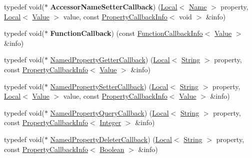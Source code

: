 \begin{DoxyCompactItemize}
\item 
\mbox{\label{namespacev8_a476b359c9fc5ad874bcc2a1a21075556}} 
typedef void($\ast$ {\bfseries Accessor\+Name\+Setter\+Callback}) (\mbox{\hyperlink{classv8_1_1Local}{Local}}$<$ \mbox{\hyperlink{classv8_1_1Name}{Name}} $>$ property, \mbox{\hyperlink{classv8_1_1Local}{Local}}$<$ \mbox{\hyperlink{classv8_1_1Value}{Value}} $>$ value, const \mbox{\hyperlink{classv8_1_1PropertyCallbackInfo}{Property\+Callback\+Info}}$<$ void $>$ \&info)
\item 
\mbox{\label{namespacev8_a9eb0624666bb117aea1fb9c9424dcc1b}} 
typedef void($\ast$ {\bfseries Function\+Callback}) (const \mbox{\hyperlink{classv8_1_1FunctionCallbackInfo}{Function\+Callback\+Info}}$<$ \mbox{\hyperlink{classv8_1_1Value}{Value}} $>$ \&info)
\item 
typedef void($\ast$ \mbox{\hyperlink{namespacev8_a50cae386a68bf9ff23d02aa1161face4}{Named\+Property\+Getter\+Callback}}) (\mbox{\hyperlink{classv8_1_1Local}{Local}}$<$ \mbox{\hyperlink{classv8_1_1String}{String}} $>$ property, const \mbox{\hyperlink{classv8_1_1PropertyCallbackInfo}{Property\+Callback\+Info}}$<$ \mbox{\hyperlink{classv8_1_1Value}{Value}} $>$ \&info)
\item 
typedef void($\ast$ \mbox{\hyperlink{namespacev8_a9587769513971dc7cb301b740d9e66b6}{Named\+Property\+Setter\+Callback}}) (\mbox{\hyperlink{classv8_1_1Local}{Local}}$<$ \mbox{\hyperlink{classv8_1_1String}{String}} $>$ property, \mbox{\hyperlink{classv8_1_1Local}{Local}}$<$ \mbox{\hyperlink{classv8_1_1Value}{Value}} $>$ value, const \mbox{\hyperlink{classv8_1_1PropertyCallbackInfo}{Property\+Callback\+Info}}$<$ \mbox{\hyperlink{classv8_1_1Value}{Value}} $>$ \&info)
\item 
typedef void($\ast$ \mbox{\hyperlink{namespacev8_ac135beae5f0c8b290255accb438f990e}{Named\+Property\+Query\+Callback}}) (\mbox{\hyperlink{classv8_1_1Local}{Local}}$<$ \mbox{\hyperlink{classv8_1_1String}{String}} $>$ property, const \mbox{\hyperlink{classv8_1_1PropertyCallbackInfo}{Property\+Callback\+Info}}$<$ \mbox{\hyperlink{classv8_1_1Integer}{Integer}} $>$ \&info)
\item 
typedef void($\ast$ \mbox{\hyperlink{namespacev8_aaba861076c5b111912cfa0791d348437}{Named\+Property\+Deleter\+Callback}}) (\mbox{\hyperlink{classv8_1_1Local}{Local}}$<$ \mbox{\hyperlink{classv8_1_1String}{String}} $>$ property, const \mbox{\hyperlink{classv8_1_1PropertyCallbackInfo}{Property\+Callback\+Info}}$<$ \mbox{\hyperlink{classv8_1_1Boolean}{Boolean}} $>$ \&info)

\end{DoxyCompactItemize}
